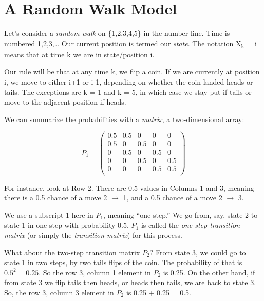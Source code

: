 \documentclass[
  letterpaper,
  DIV=11,
  numbers=noendperiod,
  oneside]{scrreprt}
\begin{document}
\newpage{}

\hypertarget{a-random-walk-model}{%
\section{A Random Walk Model}\label{a-random-walk-model}}

Let's consider a \emph{random walk} on \{1,2,3,4,5\} in the number line.
Time is numbered 1,2,3,\ldots{} Our current position is termed our
\emph{state}. The notation X\textsubscript{k} = i means that at time k
we are in state/position i.

Our rule will be that at any time k, we flip a coin. If we are currently
at position i, we move to either i+1 or i-1, depending on whether the
coin landed heads or tails. The exceptions are k = 1 and k = 5, in which
case we stay put if tails or move to the adjacent position if heads.

We can summarize the probabilities with a \emph{matrix}, a
two-dimensional array:

\[
P_1 =
\left (
\begin{array}{rrrrr}
0.5 & 0.5 & 0 & 0 & 0\\
0.5 & 0 & 0.5 & 0 & 0\\
0 & 0.5 & 0 & 0.5 & 0\\
0 & 0 & 0.5 & 0 & 0.5\\
0 & 0 & 0 & 0.5 & 0.5 \\
\end{array}
\right )
\]

For instance, look at Row 2. There are 0.5 values in Columns 1 and 3,
meaning there is a 0.5 chance of a move 2 \(\rightarrow\) 1, and a 0.5
chance of a move 2 \(\rightarrow\) 3.
{}

We use a subscript 1 here in \(P_1\), meaning ``one step.'' We go from,
say, state 2 to state 1 in one step with probability 0.5. \(P_1\) is
called the \emph{one-step transition matrix} (or simply the
\emph{transition matrix}) for this process.

What about the two-step transition matrix \(P_2\)? From state 3, we
could go to state 1 in two steps, by two tails flips of the coin. The
probability of that is \(0.5^2 = 0.25\). So the row 3, column 1 element
in \(P_2\) is 0.25. On the other hand, if from state 3 we flip tails
then heads, or heads then tails, we are back to state 3. So, the row 3,
column 3 element in \(P_2\) is 0.25 + 0.25 = 0.5.
\end{document}
